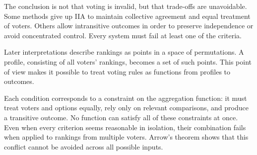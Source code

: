 The conclusion is not that voting is invalid, but that trade-offs are unavoidable. Some methods give up IIA to maintain collective agreement and equal treatment of voters. Others allow intransitive outcomes in order to preserve independence or avoid concentrated control. Every system must fail at least one of the criteria.

Later interpretations describe rankings as points in a space of permutations. A profile, consisting of all voters’ rankings, becomes a set of such points. This point of view makes it possible to treat voting rules as functions from profiles to outcomes.

Each condition corresponds to a constraint on the aggregation function: it must treat voters and options equally, rely only on relevant comparisons, and produce a transitive outcome. No function can satisfy all of these constraints at once. Even when every criterion seems reasonable in isolation, their combination fails when applied to rankings from multiple voters. Arrow’s theorem shows that this conflict cannot be avoided across all possible inputs.

